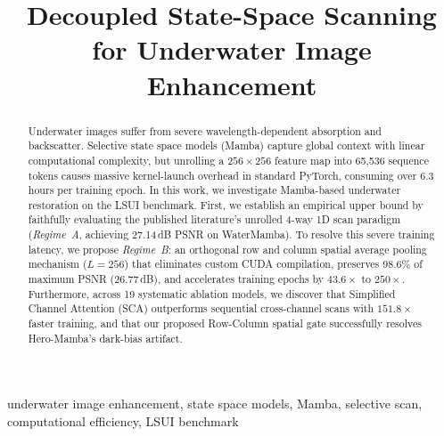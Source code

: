 \documentclass[conference]{IEEEtran}
\begin{document}
	
	\title{Decoupled State-Space Scanning for Underwater Image Enhancement}
	
	\author{
		\and
		\and
	}
	
	\maketitle
	
	\begin{abstract}
		Underwater images suffer from severe wavelength-dependent absorption and backscatter. Selective state space models (Mamba) capture global context with linear computational complexity, but unrolling a $256\times256$ feature map into 65{,}536 sequence tokens causes massive kernel-launch overhead in standard PyTorch, consuming over 6.3 hours per training epoch. In this work, we investigate Mamba-based underwater restoration on the LSUI benchmark. First, we establish an empirical upper bound by faithfully evaluating the published literature's unrolled 4-way 1D scan paradigm (\emph{Regime~A}, achieving 27.14\,dB PSNR on WaterMamba). To resolve this severe training latency, we propose \emph{Regime~B}: an orthogonal row and column spatial average pooling mechanism ($L=256$) that eliminates custom CUDA compilation, preserves 98.6\% of maximum PSNR (26.77\,dB), and accelerates training epochs by $43.6\times$ to $250\times$. Furthermore, across 19 systematic ablation models, we discover that Simplified Channel Attention (SCA) outperforms sequential cross-channel scans with $151.8\times$ faster training, and that our proposed Row-Column spatial gate successfully resolves Hero-Mamba's dark-bias artifact.
	\end{abstract}
	
	\begin{IEEEkeywords}
		underwater image enhancement, state space models, Mamba, selective scan, computational efficiency, LSUI benchmark
	\end{IEEEkeywords}
	
\end{document}

